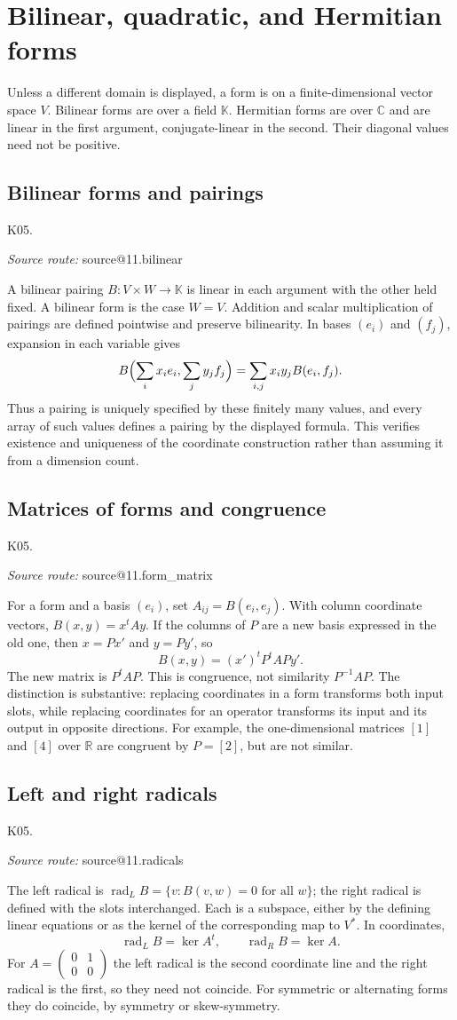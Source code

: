 \documentclass[11pt,a4paper]{book}
\makeatletter
\theoremstyle{definition}\newtheorem{definition}[theorem]{Definition}
\theoremstyle{remark}\newtheorem{remark}[theorem]{Remark}
\newcommand{\K}{\mathbb K}\newcommand{\R}{\mathbb R}\newcommand{\C}{\mathbb C}
\newcommand{\Kentry}[2]{\section{#2}\label{k:#1}\noindent\textsf{\small K05.\detokenize{#1}}\par
  \begingroup\small\color{black!65}\textit{Source route: }\csname source@#1\endcsname\par\endgroup}
\makeatother
\begin{document}


\chapter{Bilinear, quadratic, and Hermitian forms}
Unless a different domain is displayed, a form is on a finite-dimensional vector space $V$. Bilinear forms are over a field $\K$. Hermitian forms are over $\C$ and are linear in the first argument, conjugate-linear in the second. Their diagonal values need not be positive.

\Kentry{11.bilinear}{Bilinear forms and pairings}
A bilinear pairing $B:V\times W\to\K$ is linear in each argument with the other held fixed. A bilinear form is the case $W=V$. Addition and scalar multiplication of pairings are defined pointwise and preserve bilinearity. In bases $(e_i)$ and $(f_j)$, expansion in each variable gives
\[B\Bigl(\sum_i x_ie_i,\sum_j y_jf_j\Bigr)=\sum_{i,j}x_iy_j B(e_i,f_j).
\]
Thus a pairing is uniquely specified by these finitely many values, and every array of such values defines a pairing by the displayed formula. This verifies existence and uniqueness of the coordinate construction rather than assuming it from a dimension count.

\Kentry{11.form_matrix}{Matrices of forms and congruence}
For a form and a basis $(e_i)$, set $A_{ij}=B(e_i,e_j)$. With column coordinate vectors, $B(x,y)=x^tAy$. If the columns of $P$ are a new basis expressed in the old one, then $x=Px'$ and $y=Py'$, so
\[B(x,y)=(x')^t P^tAPy'.\]
The new matrix is $P^tAP$. This is congruence, not similarity $P^{-1}AP$. The distinction is substantive: replacing coordinates in a form transforms both input slots, while replacing coordinates for an operator transforms its input and its output in opposite directions. For example, the one-dimensional matrices $[1]$ and $[4]$ over $\R$ are congruent by $P=[2]$, but are not similar.

\Kentry{11.radicals}{Left and right radicals}
The left radical is $\operatorname{rad}_L B=\{v:B(v,w)=0\text{ for all }w\}$; the right radical is defined with the slots interchanged. Each is a subspace, either by the defining linear equations or as the kernel of the corresponding map to $V^*$. In coordinates,
\[\operatorname{rad}_L B=\ker A^t,\qquad \operatorname{rad}_R B=\ker A.
\]
For $A=\begin{pmatrix}0&1\\0&0\end{pmatrix}$ the left radical is the second coordinate line and the right radical is the first, so they need not coincide. For symmetric or alternating forms they do coincide, by symmetry or skew-symmetry.
\end{document}
